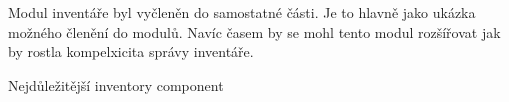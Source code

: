 
Modul inventáře byl vyčleněn do samostatné části. Je to hlavně jako ukázka možného členění do modulů.  Navíc časem by se mohl tento modul rozšířovat jak by rostla kompelxicita správy inventáře.

Nejdůležitější inventory component